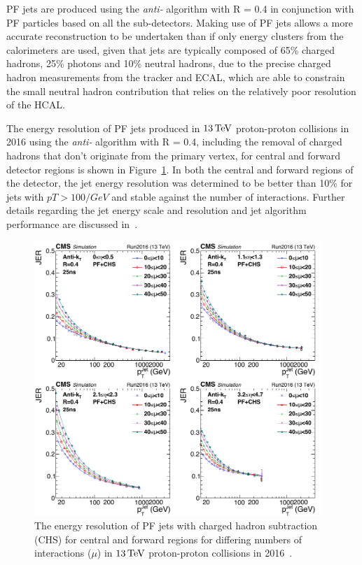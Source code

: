 PF jets are produced using the \emph{anti-\kt} algorithm with R = 0.4 in conjunction with PF particles based on all the sub-detectors.
Making use of PF jets allows a more accurate reconstruction to be undertaken than if only energy clusters from the calorimeters are used, given that jets are typically composed of 65\% charged hadrons, 25\% photons and 10\% neutral hadrons, due to the precise charged hadron measurements from the tracker and ECAL, which are able to constrain the small neutral hadron contribution that relies on the relatively poor resolution of the HCAL.	

The energy resolution of PF jets produced in $13\,\text{Te\hspace{-.08em}V}$ proton-proton collisions in 2016 using the \emph{anti-\kt} algorithm with R = 0.4, including the removal of charged hadrons that don't originate from the primary vertex, for central and forward detector regions is shown in Figure~\ref{fig:JERs}.
In both the central and forward regions of the detector, the jet energy resolution was determined to be better than 10\% for jets with $pT>100/GeV$ and stable against the number of \PU interactions.
Further details regarding the jet energy scale and resolution and jet algorithm performance are discussed in~\cite{Khachatryan:2016kdb,CMS:2017wyc}.

\begin{figure}[htbp]
\centering
\includegraphics[width=0.97\textwidth]{figs/data-mc/JER.pdf}
\caption{The energy resolution of PF jets with charged hadron subtraction (CHS) for central and forward regions for differing numbers of \PU interactions ($\mu$) in $13\,\text{Te\hspace{-.08em}V}$ proton-proton collisions in 2016~\cite{CMS-DP-2016-020}.}
\label{fig:JERs}
\end{figure}

